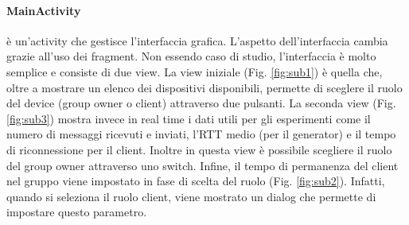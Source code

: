 \documentclass{llncs}
\begin{document}
\paragraph{MainActivity} è un'activity che gestisce l'interfaccia grafica. L'aspetto dell'interfaccia cambia grazie all'uso dei fragment. Non essendo caso di studio, l'interfaccia è molto semplice e consiste di due view. La view iniziale (Fig. \ref{fig:sub1}) è quella che, oltre a mostrare un elenco dei dispositivi disponibili, permette di sceglere il ruolo del device (group owner o client) attraverso due pulsanti. La seconda view (Fig. \ref{fig:sub3}) mostra invece in real time i dati utili per gli esperimenti come il numero di messaggi ricevuti e inviati, l'RTT medio (per il generator) e il tempo di riconnessione per il client. Inoltre in questa view è possibile scegliere il ruolo del group owner attraverso uno switch. Infine, il tempo di permanenza del client nel gruppo viene impostato in fase di scelta del ruolo (Fig. \ref{fig:sub2}). Infatti, quando si seleziona il ruolo client, viene mostrato un dialog che permette di impostare questo parametro.
\end{document}
